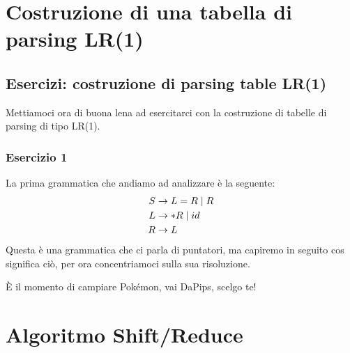 \documentclass[class=book, crop=false, oneside, 12pt]{standalone}
\begin{document}
\section{Costruzione di una tabella di parsing LR(1)}
\subsection{Esercizi: costruzione di parsing table LR(1)}
Mettiamoci ora di buona lena ad esercitarci con la costruzione di tabelle di parsing di tipo LR(1).

\subsubsection{Esercizio 1}
La prima grammatica che andiamo ad analizzare è la seguente:
\begin{align}
    \label{gr:pointers-grammar}
    S &\to L = R \mid R \\
    L &\to *R \mid id \nonumber \\ \notag
    R &\to L \notag
\end{align}
Questa è una grammatica che ci parla di puntatori, ma capiremo in seguito cos significa ciò, per ora concentriamoci sulla sua risoluzione.

È il momento di campiare Pokémon, vai DaPips, scelgo te!

\section{Algoritmo Shift/Reduce}
\end{document}
